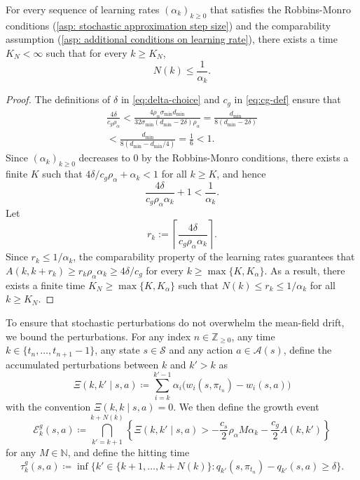 \begin{lemma}
For every sequence of learning rates $(\alpha_k)_{k \ge 0}$ that satisfies the Robbins-Monro conditions (\autoref{asp: stochastic approximation step size}) and the comparability assumption (\autoref{asp: additional conditions on learning rate}),
there exists a time $K_N < \infty$ such that for every $k \ge K_N$,
\[N(k) \le \frac{1}{\alpha_{k}} .\]
\end{lemma}
\vspace{-0.5cm}
\begin{proof}
The definitions of $\delta$ in \eqref{eq:delta-choice} and $c_g$ in \eqref{eq:cg-def} ensure that
\begin{multline*}
    \frac{4 \delta}{c_g \rho_\alpha}
    < 
    \frac{4 \rho_\alpha \sigma_{\min} d_{\min}}{32 \sigma_{\min}(d_{\min} - 2 \delta) \rho_\alpha}
    =
    \frac{d_{\min}}{8 (d_{\min} - 2 \delta)}
    \\
    <
    \frac{d_{\min}}{8(d_{\min} - d_{\min}/4)}
    =
    \frac{1}{6}
    < 1 .
\end{multline*}
Since $(\alpha_k)_{k \ge 0}$ decreases to 0 by the Robbins-Monro conditions, there exists a finite $K$ such that $4\delta / c_g \rho_\alpha + \alpha_k < 1$ for all $k \ge K$,
and hence
\[
\frac{4 \delta}{c_g \rho_\alpha \alpha_k} + 1 < \frac{1}{\alpha_k} .
\]
Let
\[
r_k := \left\lceil \frac{4 \delta}{c_g \rho_\alpha \alpha_k} \right\rceil .
\]
Since $r_k \le 1/ \alpha_k$,
the comparability property of the learning rates guarantees that $A(k, k+r_{k}) \ge r_{k} \rho_\alpha \alpha_{k} \ge 4 \delta / c_g$ for every $k \ge \max\{K, K_\alpha\}$.
As a result, there exists a finite time $K_N \ge \max\{K, K_\alpha\}$ such that $N(k) \le r_k \le 1/\alpha_{k}$ for all $k \ge K_N$.
\end{proof}

To ensure that stochastic perturbations do not overwhelm the mean-field drift, we bound the perturbations.
For any index $n \in \mathbb Z_{\ge 0}$,
any time $k \in \{t_n, \dots, t_{n+1}-1\}$,
any state $s \in \mathcal S$
and any action $a \in \mathcal A(s)$,
define the accumulated perturbations between $k$ and $k'>k$ as
\[
\Xi(k, k' \mid s,a) 
\coloneqq 
\sum_{i=k}^{k'-1} \alpha_{i} \big( w_i(s, \pi_{t_n})-w_i(s,a) \big) 
\]
with the convention $\Xi(k, k \mid s,a) = 0$.
We then define the growth event
\[
\mathcal E^g_k(s,a)
\coloneqq
\bigcap_{k'=k+1}^{k+N(k)}
\left\{
\Xi(k,k' \mid s,a) > - \frac{c_s}{2} \rho_\alpha M \alpha_k - \frac{c_g}{2} A(k,k')
\right\}
\]
for any $M \in \mathbb N$,
and define the hitting time
\[
\tau^g_k(s,a) \coloneqq \inf \! \big\{ k' \in \{k+1, \dots, k+N(k) \} : q_{k'}(s,\pi_{t_n}) - q_{k'}(s,a) \ge \delta \big\} .
\]

